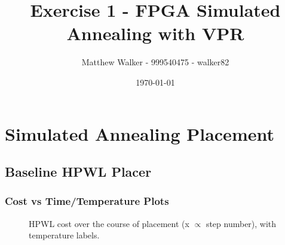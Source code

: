 \documentclass[11pt]{article}
\title{Exercise 1 - FPGA Simulated Annealing with VPR}
\author{Matthew Walker - 999540475 - walker82}
\date{\today}
\begin{document}
\maketitle

\section{Simulated Annealing Placement}
\subsection{Baseline HPWL Placer}
\subsubsection{Cost vs Time/Temperature Plots}
\begin{figure}[ht]
\caption{HPWL cost over the course of placement (x \(\propto\) step number), with temperature labels.}
\label{fig:baseline-hpwl}
\end{figure}
\end{document}
